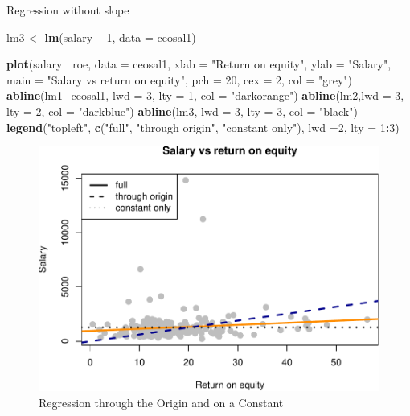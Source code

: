 \documentclass[]{book}
\newenvironment{Shaded}{\begin{snugshade}}{\end{snugshade}}
\newcommand{\DataTypeTok}[1]{\textcolor[rgb]{0.13,0.29,0.53}{#1}}
\newcommand{\DecValTok}[1]{\textcolor[rgb]{0.00,0.00,0.81}{#1}}
\newcommand{\KeywordTok}[1]{\textcolor[rgb]{0.13,0.29,0.53}{\textbf{#1}}}
\newcommand{\NormalTok}[1]{#1}
\newcommand{\OperatorTok}[1]{\textcolor[rgb]{0.81,0.36,0.00}{\textbf{#1}}}
\newcommand{\StringTok}[1]{\textcolor[rgb]{0.31,0.60,0.02}{#1}}
\begin{document}
Regression without slope

\begin{Shaded}
\begin{Highlighting}[]
\NormalTok{lm3 <-}\StringTok{ }\KeywordTok{lm}\NormalTok{(salary }\OperatorTok{~}\StringTok{ }\DecValTok{1}\NormalTok{, }\DataTypeTok{data =}\NormalTok{ ceosal1)}
\end{Highlighting}
\end{Shaded}

\begin{Shaded}
\begin{Highlighting}[]
\KeywordTok{plot}\NormalTok{(salary}\OperatorTok{~}\StringTok{ }\NormalTok{roe, }\DataTypeTok{data =}\NormalTok{ ceosal1,}
     \DataTypeTok{xlab =} \StringTok{"Return on equity"}\NormalTok{,}
     \DataTypeTok{ylab =} \StringTok{"Salary"}\NormalTok{,}
     \DataTypeTok{main =} \StringTok{"Salary vs return on equity"}\NormalTok{,}
     \DataTypeTok{pch  =} \DecValTok{20}\NormalTok{,}
     \DataTypeTok{cex  =} \DecValTok{2}\NormalTok{,}
     \DataTypeTok{col  =} \StringTok{"grey"}\NormalTok{)}
\KeywordTok{abline}\NormalTok{(lm1_ceosal1, }\DataTypeTok{lwd =} \DecValTok{3}\NormalTok{, }\DataTypeTok{lty =} \DecValTok{1}\NormalTok{, }\DataTypeTok{col =} \StringTok{"darkorange"}\NormalTok{)}
\KeywordTok{abline}\NormalTok{(lm2,}\DataTypeTok{lwd =} \DecValTok{3}\NormalTok{,  }\DataTypeTok{lty =} \DecValTok{2}\NormalTok{,   }\DataTypeTok{col =} \StringTok{"darkblue"}\NormalTok{)}
\KeywordTok{abline}\NormalTok{(lm3, }\DataTypeTok{lwd =} \DecValTok{3}\NormalTok{,  }\DataTypeTok{lty =} \DecValTok{3}\NormalTok{,   }\DataTypeTok{col =} \StringTok{"black"}\NormalTok{)}
\KeywordTok{legend}\NormalTok{(}\StringTok{"topleft"}\NormalTok{, }
       \KeywordTok{c}\NormalTok{(}\StringTok{"full"}\NormalTok{, }
         \StringTok{"through origin"}\NormalTok{, }
         \StringTok{"constant only"}\NormalTok{), }
       \DataTypeTok{lwd =}\DecValTok{2}\NormalTok{, }
       \DataTypeTok{lty =} \DecValTok{1}\OperatorTok{:}\DecValTok{3}\NormalTok{)}
\end{Highlighting}
\end{Shaded}

\begin{figure}

{\centering \includegraphics[width=0.8\linewidth]{MEM5220_R_files/figure-latex/fig3-1} 

}

\caption{Regression through the Origin and on a Constant}\label{fig:fig3}
\end{figure}
\end{document}
